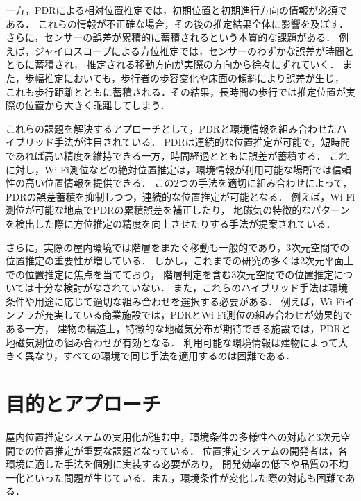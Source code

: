 一方，PDRによる相対位置推定では，初期位置と初期進行方向の情報が必須である．
これらの情報が不正確な場合，その後の推定結果全体に影響を及ぼす．
さらに，センサーの誤差が累積的に蓄積されるという本質的な課題がある．
例えば，ジャイロスコープによる方位推定では，センサーのわずかな誤差が時間とともに蓄積され，
推定される移動方向が実際の方向から徐々にずれていく．
また，歩幅推定においても，歩行者の歩容変化や床面の傾斜により誤差が生じ，
これも歩行距離とともに蓄積される．その結果，長時間の歩行では推定位置が実際の位置から大きく乖離してしまう．

これらの課題を解決するアプローチとして，PDRと環境情報を組み合わせたハイブリッド手法が注目されている．
PDRは連続的な位置推定が可能で，短時間であれば高い精度を維持できる一方，時間経過とともに誤差が蓄積する．
これに対し，Wi-Fi測位などの絶対位置推定は，環境情報が利用可能な場所では信頼性の高い位置情報を提供できる．
この2つの手法を適切に組み合わせによって，PDRの誤差蓄積を抑制しつつ，連続的な位置推定が可能となる．
例えば，Wi-Fi測位が可能な地点でPDRの累積誤差を補正したり，
地磁気の特徴的なパターンを検出した際に方位推定の精度を向上させたりする手法が提案されている．

さらに，実際の屋内環境では階層をまたぐ移動も一般的であり，3次元空間での位置推定の重要性が増している．
しかし，これまでの研究の多くは2次元平面上での位置推定に焦点を当てており，
階層判定を含む3次元空間での位置推定については十分な検討がなされていない．
また，これらのハイブリッド手法は環境条件や用途に応じて適切な組み合わせを選択する必要がある．
例えば，Wi-Fiインフラが充実している商業施設では，PDRとWi-Fi測位の組み合わせが効果的である一方，
建物の構造上，特徴的な地磁気分布が期待できる施設では，PDRと地磁気測位の組み合わせが有効となる．
利用可能な環境情報は建物によって大きく異なり，すべての環境で同じ手法を適用するのは困難である．



\section{目的とアプローチ}

屋内位置推定システムの実用化が進む中，環境条件の多様性への対応と3次元空間での位置推定が重要な課題となっている．
位置推定システムの開発者は，各環境に適した手法を個別に実装する必要があり，
開発効率の低下や品質の不均一化といった問題が生じている．また，環境条件が変化した際の対応も困難である．

